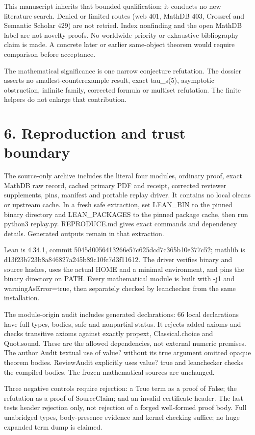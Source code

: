 \documentclass[10pt]{article}
\begin{document}
This manuscript inherits that bounded qualification; it conducts no new literature search. Denied or limited routes (web 401, MathDB 403, Crossref and Semantic Scholar 429) are not retried. Index nonfinding and the open MathDB label are not novelty proofs. No worldwide priority or exhaustive bibliography claim is made. A concrete later or earlier same-object theorem would require comparison before acceptance.


The mathematical significance is one narrow conjecture refutation. The dossier asserts no smallest-counterexample result, exact tau\_s(5), asymptotic obstruction, infinite family, corrected formula or multiset refutation. The finite helpers do not enlarge that contribution.


\clearpage
\section*{6. Reproduction and trust boundary}
The source-only archive includes the literal four modules, ordinary proof, exact MathDB raw record, cached primary PDF and receipt, corrected reviewer supplements, pins, manifest and portable replay driver. It contains no local oleans or upstream cache. In a fresh safe extraction, set LEAN\_BIN to the pinned binary directory and LEAN\_PACKAGES to the pinned package cache, then run python3 replay.py. REPRODUCE.md gives exact commands and dependency details. Generated outputs remain in that extraction.


Lean is 4.34.1, commit 5045d0056413266e57c625dcd7c365b10e377c52; mathlib is d13f23b723b8a846827a245b89c10fc7d3f11612. The driver verifies binary and source hashes, uses the actual HOME and a minimal environment, and pins the binary directory on PATH. Every mathematical module is built with -j1 and warningAsError=true, then separately checked by leanchecker from the same installation.


The module-origin audit includes generated declarations: 66 local declarations have full types, bodies, safe and nonpartial status. It rejects added axioms and checks transitive axioms against exactly propext, Classical.choice and Quot.sound. These are the allowed dependencies, not external numeric premises. The author Audit textual use of value? without its true argument omitted opaque theorem bodies. ReviewAudit explicitly uses value? true and leanchecker checks the compiled bodies. The frozen mathematical sources are unchanged.


Three negative controls require rejection: a True term as a proof of False; the refutation as a proof of SourceClaim; and an invalid certificate header. The last tests header rejection only, not rejection of a forged well-formed proof body. Full unabridged types, body-presence evidence and kernel checking suffice; no huge expanded term dump is claimed.
\end{document}

